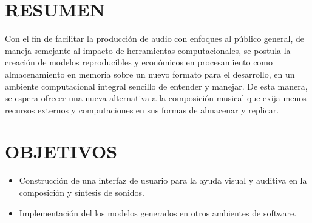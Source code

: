 \documentclass{book}
\begin{document}
	\pagebreak\section*{RESUMEN}
	Con el fin de facilitar la producción de audio con enfoques al público general, de maneja semejante al impacto de herramientas computacionales, se postula la creación de modelos reproducibles y económicos en procesamiento como almacenamiento en memoria sobre un nuevo formato para el desarrollo, en un ambiente computacional integral sencillo de entender y manejar. De esta manera, se espera ofrecer una nueva alternativa a la composición musical que exija menos recursos externos y computaciones en sus formas de almacenar y replicar.
	\section*{OBJETIVOS}
	\begin{itemize}
		\item Construcción de una interfaz de usuario para la ayuda visual y auditiva en la composición y síntesis de sonidos.
		\item Implementación del los modelos generados en otros ambientes de software.
	\end{itemize}
	\tableofcontents\pagebreak\setcounter{page}{0}
	
\end{document}
